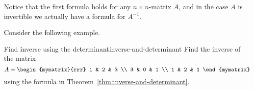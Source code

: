 
Notice that the first formula holds for any $n \times n$-matrix $A$,
and in the case $A$ is invertible we actually have a formula for
$A^{-1}$.

Consider the following example.

\begin{example}{Find inverse using the determinant}{inverse-and-determinant}
  Find the inverse of the matrix
  \begin{equation*}
    A=\begin{mymatrix}{rrr}
      1 & 2 & 3 \\
      3 & 0 & 1 \\
      1 & 2 & 1
    \end{mymatrix}
  \end{equation*}
  using the formula in Theorem~\ref{thm:inverse-and-determinant}.
\end{example}

